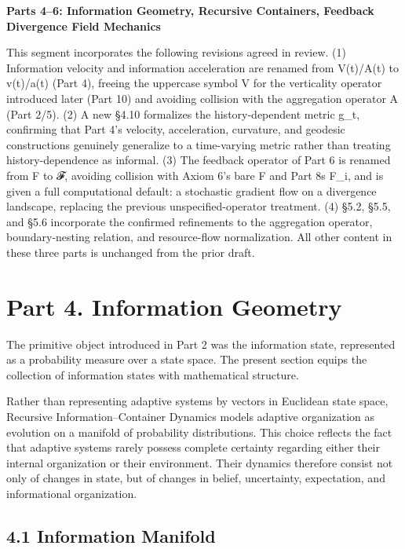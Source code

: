 \documentclass[
]{article}
\begin{document}
\textbf{Parts 4--6: Information Geometry, Recursive Containers, Feedback
Divergence Field Mechanics}

This segment incorporates the following revisions agreed in review. (1)
Information velocity and information acceleration are renamed from
V(t)/A(t) to v(t)/a(t) (Part 4), freeing the uppercase symbol V for the
verticality operator introduced later (Part 10) and avoiding collision
with the aggregation operator A (Part 2/5). (2) A new §4.10 formalizes
the history-dependent metric g\_t, confirming that Part 4's velocity,
acceleration, curvature, and geodesic constructions genuinely generalize
to a time-varying metric rather than treating history-dependence as
informal. (3) The feedback operator of Part 6 is renamed from F to 𝓕,
avoiding collision with Axiom 6's bare F and Part 8s F\_i, and is given a
full computational default: a stochastic gradient flow on a divergence
landscape, replacing the previous unspecified-operator treatment. (4)
§5.2, §5.5, and §5.6 incorporate the confirmed refinements to the
aggregation operator, boundary-nesting relation, and resource-flow
normalization. All other content in these three parts is unchanged from
the prior draft.

\hypertarget{part-4.-information-geometry}{%
\section{Part 4. Information
Geometry}\label{part-4.-information-geometry}}

The primitive object introduced in Part 2 was the information state,
represented as a probability measure over a state space. The present
section equips the collection of information states with mathematical
structure.

Rather than representing adaptive systems by vectors in Euclidean state
space, Recursive Information--Container Dynamics models adaptive
organization as evolution on a manifold of probability distributions.
This choice reflects the fact that adaptive systems rarely possess
complete certainty regarding either their internal organization or their
environment. Their dynamics therefore consist not only of changes in
state, but of changes in belief, uncertainty, expectation, and
informational organization.

\hypertarget{information-manifold}{%
\subsection{4.1 Information Manifold}\label{information-manifold}}
\end{document}
